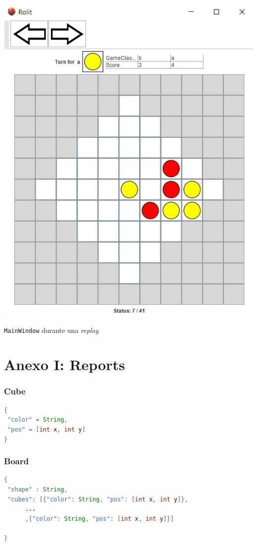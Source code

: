 \documentclass[12pt,a4paper,openright]{book}
\theoremstyle{break}
\begin{document}
\begin{center}
\includegraphics[scale=0.9]{replay-sprint-6.png}

\texttt{MainWindow} durante una \textit{replay}
\end{center}


\chapter{Anexo I: Reports}
\subsection*{Cube}

\begin{lstlisting}[frame=single, language=Java]
{
 "color" = String,
 "pos" = [int x, int y]
}
\end{lstlisting}

\subsection*{Board}
\begin{lstlisting}[frame=single, language=Java]
{
 "shape" : String,
 "cubes": [{"color": String, "pos": [int x, int y]},
 	  ...
 	  ,{"color": String, "pos": [int x, int y]}]

}
\end{lstlisting}
\end{document}
